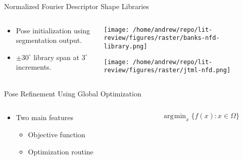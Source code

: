 \documentclass[presentation, aspectratio=1610]{beamer}
\DeclareMathOperator*{\argmin}{\arg\!min}
\begin{document}
\begin{frame}[label={sec:orge7ae5e1}]{Normalized Fourier Descriptor Shape Libraries}
\begin{columns}
\begin{column}{0.37\columnwidth}
\begin{itemize}
\item Pose initialization using segmentation output.
\item \(\pm 30^{\circ}\) library span at \(3^{\circ}\) increments.
\end{itemize}
\end{column}

\begin{column}{0.7\columnwidth}
\begin{center}
\texttt{[image: /home/andrew/repo/lit-review/figures/raster/banks-nfd-library.png]}
\end{center}
\begin{center}
\texttt{[image: /home/andrew/repo/lit-review/figures/raster/jtml-nfd.png]}
\end{center}
\end{column}
\end{columns}
\end{frame}
\begin{frame}[label={sec:org7f96cf1}]{Pose Refinement Using Global Optimization}
\begin{columns}
\begin{column}{0.5\columnwidth}
\begin{itemize}
\item Two main features
\begin{itemize}
\item Objective function
\item Optimization routine
\end{itemize}
\end{itemize}
\end{column}
\begin{column}{0.5\columnwidth}
\begin{equation*}
    \argmin_{x}\{f(x) : x \in \Omega\}
\end{equation*}
\end{column}
\end{columns}
\end{frame}
\end{document}
